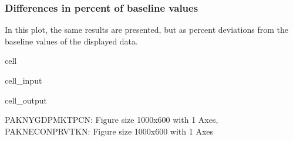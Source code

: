 \documentclass[letterpaper,10pt,english]{jupyterBook}
\begin{document}
\subsubsection{Differences in percent of baseline values}
\label{\detokenize{content/05_WBModels/ScenarioAnalysis:differences-in-percent-of-baseline-values}}
\sphinxAtStartPar
In this plot, the same results are presented, but as percent deviations from the baseline values of the displayed data.

\begin{sphinxuseclass}{cell}\begin{sphinxVerbatimInput}

\begin{sphinxuseclass}{cell_input}
\begin{sphinxVerbatim}[commandchars=\\\{\}]
  
\end{sphinxVerbatim}

\end{sphinxuseclass}\end{sphinxVerbatimInput}
\begin{sphinxVerbatimOutput}

\begin{sphinxuseclass}{cell_output}
\noindent{}

\noindent{}

\begin{sphinxVerbatim}[commandchars=\\\{\}]
\PYGZob{}\PYGZsq{}PAKNYGDPMKTPCN\PYGZsq{}: \PYGZlt{}Figure size 1000x600 with 1 Axes\PYGZgt{},
 \PYGZsq{}PAKNECONPRVTKN\PYGZsq{}: \PYGZlt{}Figure size 1000x600 with 1 Axes\PYGZgt{}\PYGZcb{}
\end{sphinxVerbatim}

\end{sphinxuseclass}\end{sphinxVerbatimOutput}

\end{sphinxuseclass}
\end{document}
